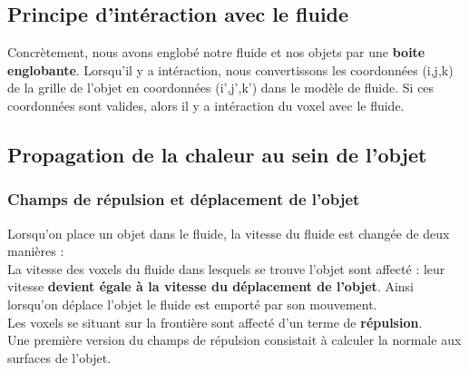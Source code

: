 \documentclass[a4paper,10pt]{article}
\begin{document}
\subsection{Principe d'intéraction avec le fluide}
Concrètement, nous avons englobé notre fluide et nos objets par une \textbf{boite englobante}.
Lorsqu'il y a intéraction, nous convertissons les coordonnées (i,j,k) de la grille de
l'objet en coordonnées (i',j',k') dans le modèle de fluide. Si ces coordonnées sont 
valides, alors il y a intéraction du voxel avec le fluide.\\




\subsection{Propagation de la chaleur au sein de l'objet}

\subsubsection{Champs de répulsion et déplacement de l'objet}

    Lorsqu'on place un objet dans le fluide, la vitesse du fluide est changée de deux manières :\\
    La vitesse des voxels du fluide dans lesquels se trouve l'objet sont affecté : leur vitesse \textbf{devient égale à la vitesse du déplacement de l'objet}. Ainsi lorsqu'on déplace l'objet le fluide est emporté par son mouvement.\\
    Les voxels se situant sur la frontière sont affecté d'un terme de \textbf{répulsion}. \\
    
    
    Une première version du champs de répulsion consistait à calculer la normale aux surfaces de l'objet.\\
    
\end{document}
